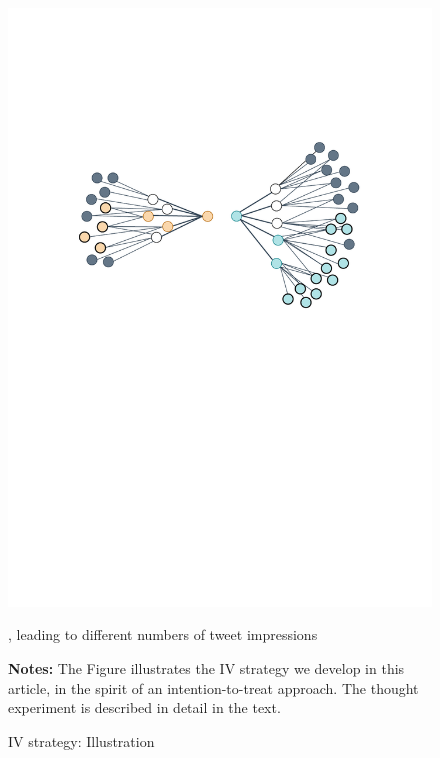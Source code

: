 \begin{figure}
\begin{center}
\begin{subtable}{1\textwidth}
        \includegraphics[scale=.6]{figures/followers/follower3}
        \caption{, leading to different numbers of tweet impressions}
        \label{fig:follower3}
    \end{subtable}
\end{center}
\begin{spacing}{0.5}
		{\footnotesize \textbf{Notes:} The Figure illustrates the IV strategy we develop in this article, in the spirit of an intention-to-treat approach. The thought experiment is described in detail in the text.}
\end{spacing}
\vspace{.5cm}	
\caption{IV strategy: Illustration}
\label{fig:follower}
\end{figure}

